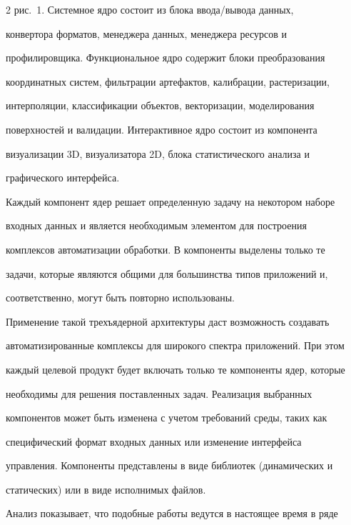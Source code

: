 \begin{multicols}{2}
рис.~1. Системное ядро состоит из блока ввода/вывода данных, 

конвертора форматов, менеджера данных, менеджера ресурсов и 

профилировщика. Функциональное ядро содержит блоки преобразования 

координатных систем, фильтрации артефактов, калибрации, растеризации, 

интерполяции, классификации объектов, векторизации, моделирования 

поверхностей и валидации. Интерактивное ядро состоит из компонента %

визуализации 3D, визуализатора 2D, блока статистического анализа и 

графического интерфейса.

   

   Каждый компонент ядер решает определенную задачу на некотором наборе 

входных данных и является необходимым элементом для построения 

комплексов автоматизации обработки. В компоненты выделены только те 

задачи, которые являются общими для большинства типов приложений и, 

соответственно, могут быть повторно использованы.

   

   Применение такой трехъядерной архитектуры даст возможность создавать 

автоматизированные комплексы для широкого спектра приложений. При этом 

каждый целевой продукт будет включать только те компоненты ядер, которые 

необходимы для решения поставленных задач. Реализация выбранных 

компонентов может быть изменена с учетом требований среды, таких как 

специфический формат входных данных или изменение интерфейса 

управления. Компоненты представлены в виде библиотек (динамических и 

статических) или в виде исполнимых файлов.

   



   Анализ показывает, что подобные работы ведутся в настоящее время в ряде 


\end{multicols}
